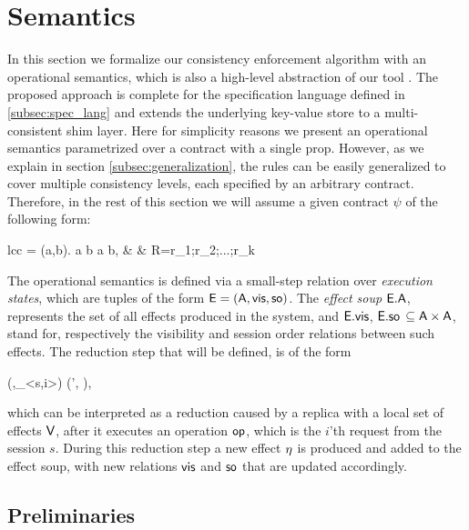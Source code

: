 %
%
\section{Semantics}
In this section we formalize our consistency enforcement algorithm with an
operational semantics, which is also a high-level abstraction of our
tool \tool.
The proposed approach is complete for the specification language defined
in \ref{subsec:spec_lang}
and extends the underlying key-value store to a multi-consistent shim
layer. Here for simplicity reasons we present an operational semantics 
parametrized over a contract with a single prop. However, as we explain
in section \ref{subsec:generalization}, the rules can be easily
generalized to cover multiple consistency levels, each specified by an
arbitrary contract. Therefore, in the rest of this section we will assume a given contract $\psi$ of the
following form:
	\begin{smathpar}
	\begin{array}{lcc}
		\psi = \forall (a,b). a  b  \Rightarrow a
		\xrightarrow{\visZ} b, & \spc & R=r_1;r_2;...;r_k \\
	\end{array}
	\end{smathpar}

The operational semantics is defined via a small-step relation over \emph{execution
states}, which are tuples of the form ${\normalfont \textsf{E}}=({\normalfont \textsf{A}},{\normalfont \textsf{vis}} ,{\normalfont \textsf{so}})$.
The \emph{effect soup} ${\normalfont \textsf{E}}.{\normalfont \textsf{A}}$, represents the set of all
effects produced in the system, and  ${\normalfont \textsf{E}}.{\normalfont \textsf{vis}}$,
${\normalfont \textsf{E}}.{\normalfont \textsf{so}}$ $\subseteq {\normalfont \textsf{A}} \times {\normalfont \textsf{A}}$, stand for, respectively the
visibility and session order relations
between such effects. The reduction step that will be defined, is of the form
\begin{smathpar}
(\E,\op_{<s,i>}) \;\xrightarrow{\V}\; (\E', \eff),
\end{smathpar}
which can be interpreted as a reduction caused by a replica with a local 
set of effects ${\normalfont \textsf{V}}$, after it executes an operation
${\normalfont \textsf{op}}$, which is the $i$'th request from the session $s$. 
During this reduction step a new effect $\eta$ is produced and added to
the effect soup, with new relations ${\normalfont \textsf{vis}}$ and ${\normalfont \textsf{so}}$ that are updated
accordingly.


\subsection{Preliminaries}



